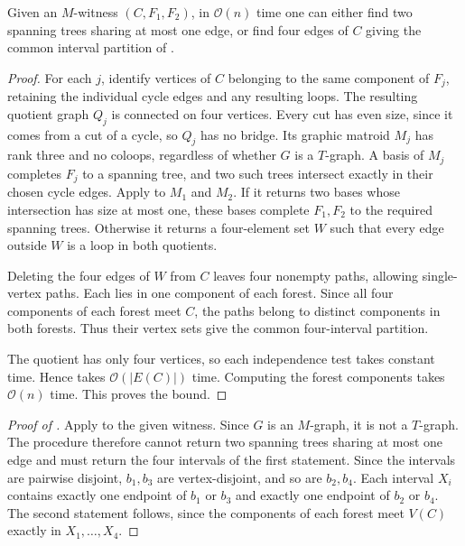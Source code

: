 \documentclass[USenglish, a4paper, thm-restate,numberwithinsect, cleveref]{lipics-v2021}
\newcommand{\Oh}{\mathcal{O}}
\begin{document}
\begin{lemma}\label{lem:constructive-cross-bases}
Given an $M$-witness $(C,F_1,F_2)$, in $\Oh(n)$ time one can either
find two spanning trees sharing at most one edge, or find four
edges of $C$ giving the common interval partition of
.
\end{lemma}
\begin{proof}
For each $j$, identify vertices of $C$ belonging to the same component
of $F_j$, retaining the individual cycle edges and any resulting loops.
The resulting quotient graph $Q_j$ is connected on four vertices.
Every cut has even size, since it comes from a cut of a cycle, so
$Q_j$ has no bridge. Its graphic matroid $M_j$ has rank three and
no coloops, regardless of whether $G$ is a $T$-graph.
A basis of $M_j$ completes $F_j$ to a spanning tree, and two such
trees intersect exactly in their chosen cycle edges.
Apply  to $M_1$ and $M_2$. If it returns two bases
whose intersection has size at most one, these bases complete
$F_1,F_2$ to the required spanning trees. Otherwise it returns a
four-element set $W$ such that every edge outside $W$ is a loop in both
quotients.

Deleting the four edges of $W$ from $C$ leaves four nonempty paths,
allowing single-vertex paths. Each lies in one component of each
forest. Since all four components of each forest meet $C$, the paths
belong to distinct components in both forests. Thus their vertex sets
give the common four-interval partition.

The quotient has only four vertices, so each independence test takes
constant time. Hence  takes $\Oh(|E(C)|)$ time.
Computing the forest components takes $\Oh(n)$ time.
This proves the bound.
\end{proof}

\begin{proof}[Proof of ]
Apply  to the given witness. Since $G$
is an $M$-graph, it is not a $T$-graph. The procedure therefore cannot
return two spanning trees sharing at most one edge and must return the
four intervals of the first statement.
Since the intervals are pairwise disjoint, $b_1,b_3$ are
vertex-disjoint, and so are $b_2,b_4$. Each interval $X_i$ contains
exactly one endpoint of $b_1$ or $b_3$ and exactly one endpoint of $b_2$
or $b_4$. The second statement follows, since the components of each
forest meet $V(C)$ exactly in $X_1,\ldots,X_4$.
\end{proof}
\end{document}

